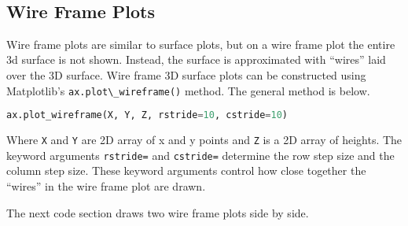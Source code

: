 \documentclass{book}
\newcommand{\passthrough}[1]{#1}
\begin{document}
    \begin{center}
    \end{center}
    { \hspace*{\fill} \\}
    

    
        \hypertarget{wire-frame-plots}{%
\subsection{Wire Frame Plots}\label{wire-frame-plots}}
    




    
        Wire frame plots are similar to surface plots, but on a wire frame plot
the entire 3d surface is not shown. Instead, the surface is approximated
with ``wires'' laid over the 3D surface. Wire frame 3D surface plots can
be constructed using Matplotlib's
\passthrough{\lstinline!ax.plot\_wireframe()!} method. The general
method is below.

\begin{lstlisting}[language=Python]
ax.plot_wireframe(X, Y, Z, rstride=10, cstride=10)
\end{lstlisting}

Where \passthrough{\lstinline!X!} and \passthrough{\lstinline!Y!} are 2D
array of x and y points and \passthrough{\lstinline!Z!} is a 2D array of
heights. The keyword arguments \passthrough{\lstinline!rstride=!} and
\passthrough{\lstinline!cstride=!} determine the row step size and the
column step size. These keyword arguments control how close together the
``wires'' in the wire frame plot are drawn.

The next code section draws two wire frame plots side by side.
    
\end{document}

